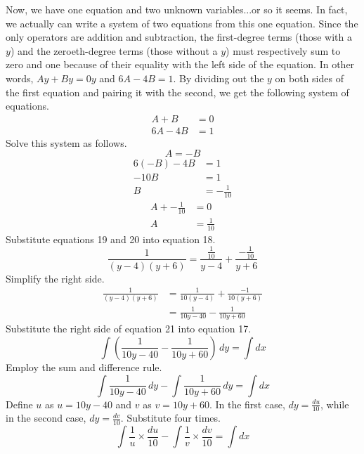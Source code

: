 \documentclass{article}
\begin{document}
Now, we have one equation and two unknown variables...or so it seems. In fact, we actually can write a system of two equations from this one equation. Since the only operators are addition and subtraction, the first-degree terms (those with a $y$) and the zeroeth-degree terms (those without a $y$) must respectively sum to zero and one because of their equality with the left side of the equation. In other words, $Ay+By=0y$ and $6A-4B=1$. By dividing out the $y$ on both sides of the first equation and pairing it with the second, we get the following system of equations.
\begin{align*}
    A+B &= 0\\
    6A-4B &= 1
\end{align*}
Solve this system as follows.
\begin{equation*}
    A=-B
\end{equation*}
\begin{align*}
    6(-B)-4B &= 1\\
    -10B &= 1\\
    B &= -\frac{1}{10}\tag{19}
\end{align*}
\begin{align*}
    A + -\frac{1}{10} &= 0\\
    A &= \frac{1}{10}\tag{20}
\end{align*}
Substitute equations 19 and 20 into equation 18.
\begin{equation*}
    \frac{1}{(y-4)(y+6)}=\frac{\frac{1}{10}}{y-4}+\frac{-\frac{1}{10}}{y+6}
\end{equation*}
Simplify the right side.
\begin{align*}
    \frac{1}{(y-4)(y+6)} &= \frac{1}{10(y-4)}+\frac{-1}{10(y+6)}\\
    &= \frac{1}{10y-40}-\frac{1}{10y+60}\tag{21}
\end{align*}
Substitute the right side of equation 21 into equation 17.
\begin{equation*}
    \int \left(\frac{1}{10y-40}-\frac{1}{10y+60}\right)\, dy=\int dx
\end{equation*}
Employ the sum and difference rule.
\begin{equation*}
    \int \frac{1}{10y-40}\, dy-\int \frac{1}{10y+60}\, dy=\int dx
\end{equation*}
Define $u$ as $u=10y-40$ and $v$ as $v=10y+60$. In the first case, $dy=\frac{du}{10}$, while in the second case, $dy=\frac{dv}{10}$. Substitute four times.
\begin{equation*}
    \int \frac{1}{u}\times \frac{du}{10}-\int \frac{1}{v}\times \frac{dv}{10}=\int dx
\end{equation*}
\end{document}
